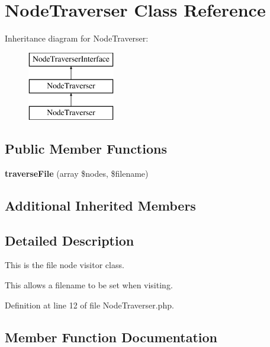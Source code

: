 \section{Node\+Traverser Class Reference}
\label{class_class_preloader_1_1_parser_1_1_node_traverser}
Inheritance diagram for Node\+Traverser\+:\begin{figure}[H]
\begin{center}
\leavevmode
\includegraphics[height=3.000000cm]{class_class_preloader_1_1_parser_1_1_node_traverser}
\end{center}
\end{figure}
\subsection*{Public Member Functions}
\begin{DoxyCompactItemize}
\item 
{\bf traverse\+File} (array \$nodes, \$filename)
\end{DoxyCompactItemize}
\subsection*{Additional Inherited Members}


\subsection{Detailed Description}
This is the file node visitor class.

This allows a filename to be set when visiting. 

Definition at line 12 of file Node\+Traverser.\+php.



\subsection{Member Function Documentation}
